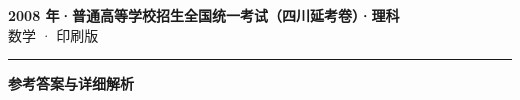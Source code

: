 \documentclass[zihao=5, a4paper]{ctexart}
\begin{document}
\begin{center}
  {\Large\bfseries 2008 年·普通高等学校招生全国统一考试（四川延考卷）·理科}\\[4pt]
  {\large 数学 · 印刷版}
\end{center}
\medskip
{}

\par\bigskip\hrule\bigskip
{}
\begin{center}{\large\bfseries 参考答案与详细解析}\end{center}
\smallskip

\end{document}
